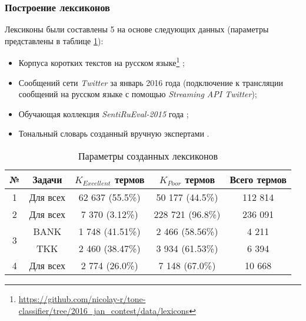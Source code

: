 \subsubsection{Построение лексиконов}

Лексиконы были составлены 5 на основе следующих данных (параметры представлены
в таблице \ref{table:createdLexicons}):

\begin{itemize}
    \item Корпуса коротких текстов на русском языке\footnote{
            \url{https://github.com/nicolay-r/tone-classifier/tree/2016_jan_contest/data/lexicons}
    }
    \cite{rubtsovaCollection};
    \item Сообщений сети {\it Twitter }  за январь 2016 года (подключение к трансляции
        сообщений на русском языке с помощью {\it Streaming API Twitter});
    \item Обучающая коллекция {\it SentiRuEval-2015} года \cite{dialog2015};
    \item Тональный словарь созданный вручную экспертами \cite{expertLexicon}.
\end{itemize}

\begin{table}[ht!]
\centering
\caption{Параметры созданных лексиконов}
\label{table:createdLexicons}
\begin{tabular}{|c|c|c|c|c|}
\hline
№                  & \multicolumn{1}{c|}{Задачи} & \multicolumn{1}{c|}{$K_{Excellent}$ термов} & \multicolumn{1}{c|}{$K_{Poor}$ термов} & \multicolumn{1}{c|}{Всего термов} \\ \hline
1                  & Для всех                    & 62 637 (55.5\%)                              & 50 177 (44.5\%)                         & 112 814                            \\ \hline
2                  & Для всех                    & 7 370 (3.12\%)                               & 228 721 (96.8\%)                        & 236 091                            \\ \hline
\multirow{2}{*}{3} & BANK                        & 1 748 (41.51\%)                              & 2 466 (58.56\%)                         & 4 211                              \\ \cline{2-5}
                   & TKK                         & 2 460 (38.47\%)                              & 3 934 (61.53\%)                         & 6 394                              \\ \hline
4                  & Для всех                    & 2 774 (26.0\%)                               & 7 148 (67.0\%)                          & 10 668                             \\ \hline
\end{tabular}
\end{table}

